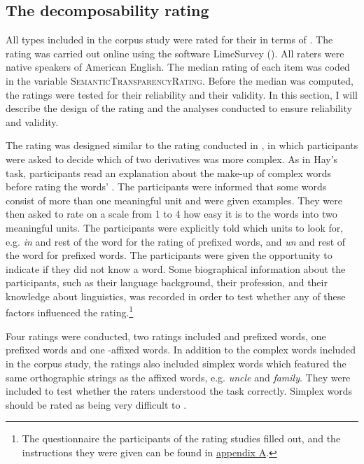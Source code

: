 \subsection{The decomposability rating} \label{decomposability rating corpus}

All types included in the corpus study were rated for their  in terms of . The rating was carried out online using the software LimeSurvey (\citealt{LimeSurveyProjectTeam.2015}). All raters were native speakers of American English. The median rating of each item was coded in the variable  \textsc{SemanticTransparencyRating}. Before the median was computed, the ratings were tested for their reliability and their validity. In this section, I will describe the design of the rating and the analyses conducted to ensure reliability and validity. 

The rating was designed similar to the rating conducted in \cite{Hay.2001}, in which participants were asked to decide which of two derivatives was more complex. As in Hay's task,  participants read an explanation about the make-up of complex words before rating the words' .  The participants were informed that some words consist of more than one meaningful unit and were given examples. 
They were then asked to rate on a scale from 1 to 4 how easy it is to  the words into two meaningful units. The participants were explicitly told which units to look for, e.g.\textit{ in} and rest of the word for the rating of prefixed words, and \textit{un} and rest of the word for prefixed words. The participants were given the opportunity to  indicate if they did not know a word. 
Some biographical information about the participants, such as their language background, their profession, and their knowledge about linguistics, was recorded in order to test whether any of these factors influenced the rating.\footnote{The questionnaire the participants of the rating studies filled out, and the instructions they were given can be found in \hyperref[Appendix A: Decomposability Rating]{appendix A}. } 

Four ratings were conducted, two ratings included  and prefixed words, one  prefixed words and one -affixed words. In addition to the complex words included in the corpus study, the ratings also included simplex words which featured the same orthographic strings as the affixed words, e.g. \textit{{un}cle} and \textit{fami{ly}}. They were included to test whether the raters understood the task correctly. Simplex words should be rated as being very difficult to . 

